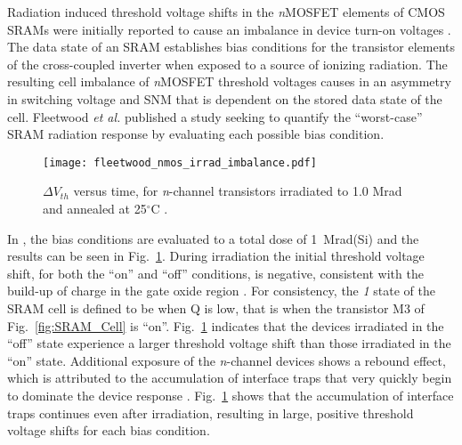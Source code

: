 Radiation induced threshold voltage shifts in the \emph{n}MOSFET elements of CMOS SRAMs were initially reported to cause an imbalance in device turn-on voltages \cite{Arimura:1985wl}.
The data state of an SRAM establishes bias conditions for the transistor elements of the cross-coupled inverter when exposed to a source of ionizing radiation. 
The resulting cell imbalance of \emph{n}MOSFET threshold voltages causes in an asymmetry in switching voltage and SNM that is dependent on the stored data state of the cell. 
Fleetwood \emph{et al.} published a study seeking to quantify the ``worst-case'' SRAM radiation response by evaluating each possible bias condition. 
\begin{figure}[htbp]
    \begin{center}
        \texttt{[image: fleetwood\_nmos\_irrad\_imbalance.pdf]}
    \end{center}
    \caption[$\Delta V_{th}$ versus time, for \emph{n}-channel transistors irradiated to 1.0 Mrad and annealed at 25$^\circ$C.]{$\Delta V_{th}$ versus time, for \emph{n}-channel transistors irradiated to 1.0 Mrad and annealed at 25$^\circ$C \cite{Fleetwood:1987cfa}.}
    \label{fig:sram_cell_imb_nmos_vth}
\end{figure}
In \cite{Fleetwood:1987cfa}, the bias conditions are evaluated to a total dose of 1~Mrad(Si) and the results can be seen in Fig.~\ref{fig:sram_cell_imb_nmos_vth}.
During irradiation the initial threshold voltage shift, for both the ``on'' and ``off'' conditions, is negative, consistent with the build-up of charge in the gate oxide region \cite{Dressendorfer:1981kg,Galloway:1990kh}. 
For consistency, the \emph{1} state of the SRAM cell is defined to be when Q is low, that is when the transistor M3 of Fig.~\ref{fig:SRAM_Cell} is ``on''.
Fig.~\ref{fig:sram_cell_imb_nmos_vth} indicates that the devices irradiated in the ``off'' state experience a larger threshold voltage shift than those irradiated in the ``on'' state.
Additional exposure of the \emph{n}-channel devices shows a rebound effect, which is attributed to the accumulation of interface traps that very quickly begin to dominate the device response \cite{Fleetwood:1993vs,Galloway:1990kh}. 
Fig.~\ref{fig:sram_cell_imb_nmos_vth} shows that the accumulation of interface traps continues even after irradiation, resulting in large, positive threshold voltage shifts for each bias condition.

